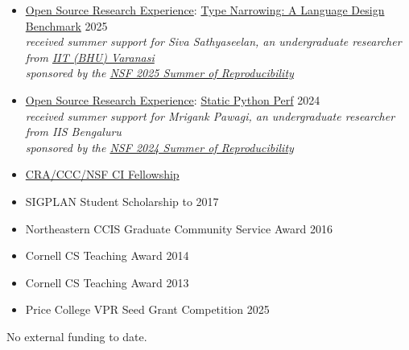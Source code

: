 \documentclass[11pt]{article}
\begin{document}

\begin{itemize}
  \item \href{https://ucsc-ospo.github.io/osre25/}{Open Source Research Experience}: \href{https://ucsc-ospo.github.io/project/osre25/uutah/type-narrowing/}{Type Narrowing: A Language Design Benchmark} \hfill 2025
    \\ \emph{received summer support for Siva Sathyaseelan, an undergraduate researcher from \href{https://www.iitbhu.ac.in/}{IIT (BHU) Varanasi}}
    \\ \emph{sponsored by the \href{https://www.nsf.gov/awardsearch/showAward?AWD_ID=2226407&HistoricalAwards=false}{NSF 2025 Summer of Reproducibility}}
  \item \href{https://ucsc-ospo.github.io/osre24/}{Open Source Research Experience}: \href{https://ucsc-ospo.github.io/project/osre24/uutah/static-python-perf/}{Static Python Perf} \hfill 2024
    \\ \emph{received summer support for Mrigank Pawagi, an undergraduate researcher from IIS Bengaluru}
    \\ \emph{sponsored by the \href{https://www.nsf.gov/awardsearch/showAward?AWD_ID=2226407&HistoricalAwards=false}{NSF 2024 Summer of Reproducibility}}
  \item \href{https://cifellows2020.org}{CRA/CCC/NSF CI Fellowship} \hfill {}
  \item {SIGPLAN Student Scholarship to \turing{}} \hfill 2017
  \item Northeastern CCIS Graduate Community Service Award \hfill 2016
  \item Cornell CS Teaching Award \hfill 2014
  \item Cornell CS Teaching Award \hfill 2013
\end{itemize}



\begin{itemize}
  \item Price College VPR Seed Grant Competition \hfill 2025
\end{itemize}

No external funding to date.
\end{document}
